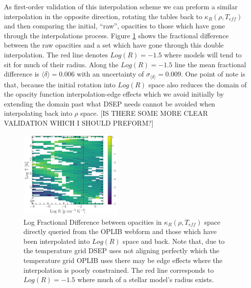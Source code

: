 As first-order validation of this interpolation scheme we can preform a similar
interpolation in the opposite direction, rotating the tables back to
$\kappa_{R}(\rho, T_{eff})$ and then comparing the initial, ``raw'', opacities
to those which have gone through the interpolations process. Figure
\ref{fig:fracdiff} shows the fractional difference between the raw opacities
and a set which have gone through this double interpolation. The red line
denotes $Log(R)=-1.5$ where models will tend to sit for much of their radius.
Along the $Log(R)=-1.5$ line the mean fractional difference is $\langle \delta
\rangle = 0.006$ with an uncertainty of $\sigma_{\langle\delta\rangle} =
0.009$. One point of note is that, because the initial rotation into $Log(R)$
space also reduces the domain of the opacity function interpolation-edge
effects which we avoid initially by extending the domain past what DSEP needs
cannot be avoided when interpolating back into $\rho$ space. {\color{red} [IS
THERE SOME MORE CLEAR VALIDATION WHICH I SHOULD PREFORM?]}

\begin{figure}
	\centering
	\includegraphics[width=0.45\textwidth]{src/figures/FractionalDifference.pdf}
	\caption{Log Fractional Difference between opacities in $\kappa_{R}(\rho,
	T_{eff})$ space directly queried from the OPLIB webform and those which
	have been interpolated into $Log(R)$ space and back. Note that, due to the
	temperature grid DSEP uses not aligning perfectly which the temperature
	grid OPLIB uses there may be edge effects where the interpolation is poorly
	constrained. The red line corresponds to $Log(R) = -1.5$ where much of a
	stellar model's radius exists.}
	\label{fig:fracdiff}
\end{figure}

